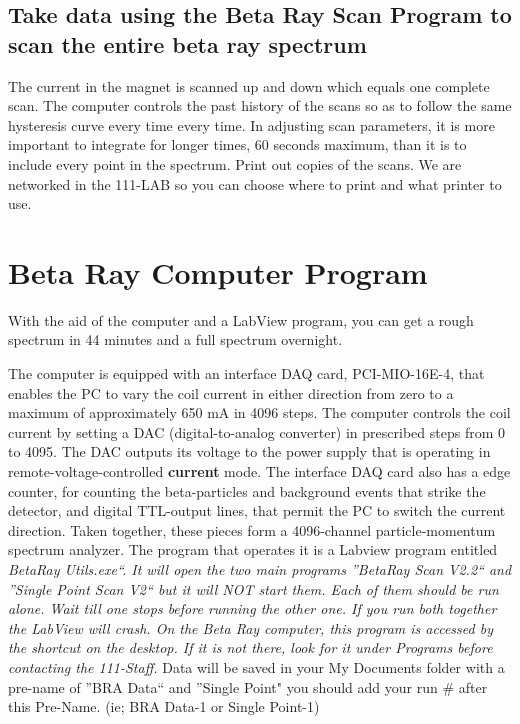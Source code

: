 \documentclass{../lab}
\begin{document}
\subsection{Take data using the Beta Ray Scan Program to scan the entire beta ray spectrum}

The current in the magnet is scanned up and down which equals one complete scan. The computer controls the past history of the scans so as to follow the same hysteresis curve every time every time. In adjusting scan parameters, it is more important to integrate for longer times, 60 seconds maximum, than it is to include every point in the spectrum. Print out copies of the scans. We are networked in the 111-LAB so you can choose where to print and what printer to use.

\section{Beta Ray Computer Program}

With the aid of the computer and a LabView program, you can get a rough spectrum in 44 minutes and a full spectrum overnight.

The computer is equipped with an interface DAQ card, PCI-MIO-16E-4, that enables the PC to vary the coil current in either direction from zero to a maximum of approximately 650 mA in 4096 steps. The computer controls the coil current by setting a DAC (digital-to-analog converter) in prescribed steps from 0 to 4095. The DAC outputs its voltage to the power supply that is operating in remote-voltage-controlled \textbf{current} mode. The interface DAQ card also has a edge counter, for counting the beta-particles and background events that strike the detector, and digital TTL-output lines, that permit the PC to switch the current direction. Taken together, these pieces form a 4096-channel particle-momentum spectrum analyzer. The program that operates it is a Labview program entitled \emph{BetaRay Utils.exe``. It will open the two main programs ''BetaRay Scan V2.2`` and ''Single Point Scan V2`` but it will NOT start them. Each of them should be run alone. Wait till one stops before running the other one. If you run both together the LabView will crash. On the Beta Ray computer, this program is accessed by the shortcut on the desktop. If it is not there, look for it under Programs before contacting the 111-Staff.} Data will be saved in your My Documents folder with a pre-name of ''BRA Data`` and ''Single Point" you should add your run \# after this Pre-Name. (ie; BRA Data-1 or Single Point-1)
\end{document}
